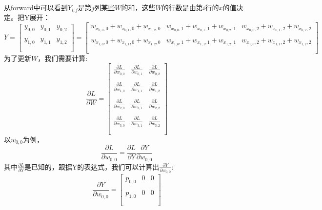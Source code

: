 \documentclass{article}
\begin{document}
从forward中可以看到$Y_{i,j}$是第$j$列某些$W$的和，这些$W$的行数是由第$i$行的$x$的值决定。把Y展开：
$$
Y=
\left[
    \begin{array}{ccc}
        y_{0,0} & y_{0,1} & y_{0,2}\\\\
        y_{1,0} & y_{1,1} & y_{1,2}\\\\
    \end{array}
\right]
=
\left[
    \begin{array}{ccc}
        w_{x_{0,0},0} + w_{x_{0,1},0} + w_{x_{0,2},0} & w_{x_{0,0},1} + w_{x_{0,1},1} + w_{x_{0,2},1} & w_{x_{0,0},2} + w_{x_{0,1},2} + w_{x_{0,2},2}\\\\
        w_{x_{1,0},0} + w_{x_{1,1},0} + w_{x_{1,2},0} & w_{x_{1,0},1} + w_{x_{1,1},1} + w_{x_{1,2},1} & w_{x_{1,0},2} + w_{x_{1,1},2} + w_{x_{1,2},2}\\\\
    \end{array}
\right]
$$
为了更新$W$，我们需要计算:
$$\frac{\partial L}{\partial W}=
\left[
    \begin{array}{ccc}
        \frac{\partial L}{\partial w_{0,0}} & \frac{\partial L}{\partial w_{0,1}} & \frac{\partial L}{\partial w_{0,2}}\\\\
        \frac{\partial L}{\partial w_{1,0}} & \frac{\partial L}{\partial w_{1,1}} & \frac{\partial L}{\partial w_{1,2}}\\\\
        \frac{\partial L}{\partial w_{2,0}} & \frac{\partial L}{\partial w_{2,1}} & \frac{\partial L}{\partial w_{2,2}}\\\\
        \frac{\partial L}{\partial w_{3,0}} & \frac{\partial L}{\partial w_{3,1}} & \frac{\partial L}{\partial w_{3,2}}\\\\
    \end{array}
\right]
$$
以$w_{0,0}$为例，
$$
\frac{\partial L}{\partial w_{0,0}}=\frac{\partial L}{\partial Y} \frac{\partial Y}{\partial w_{0,0}}
$$
其中$\frac{\partial L}{\partial Y}$是已知的，跟据Y的表达式，我们可以计算出$\frac{\partial Y}{\partial w_{0,0}}$:
$$\frac{\partial Y}{\partial w_{0,0}} = 
\left[
    \begin{array}{ccc}
        p_{0,0} & 0 & 0\\\\
        p_{1,0} & 0 & 0\\\\
    \end{array}
\right]
$$
\end{document}
